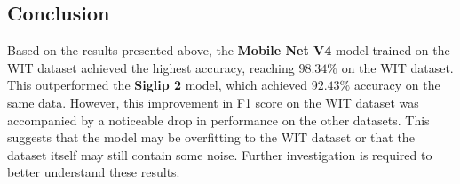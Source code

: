 \documentclass[a4paper]{article}
\begin{document}
\subsection{Conclusion}

Based on the results presented above, the \textbf{Mobile Net V4} model trained on the WIT dataset achieved the highest accuracy, reaching $98.34\%$ on the WIT dataset. This outperformed the \textbf{Siglip 2} model, which achieved $92.43\%$ accuracy on the same data. However, this improvement in F1 score on the WIT dataset was accompanied by a noticeable drop in performance on the other datasets. This suggests that the model may be overfitting to the WIT dataset or that the dataset itself may still contain some noise. Further investigation is required to better understand these results.
\end{document}
